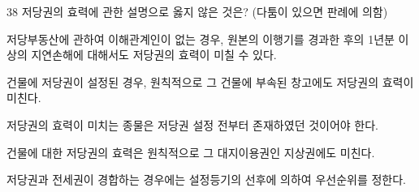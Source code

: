 \begin{question}{38}
저당권의 효력에 관한 설명으로 옳지 않은 것은? (다툼이 있으면 판례에 의함)
\begin{choices}
  \item 저당부동산에 관하여 이해관계인이 없는 경우, 원본의 이행기를 경과한 후의 1년분 이상의 지연손해에 대해서도 저당권의 효력이 미칠 수 있다.
  \item 건물에 저당권이 설정된 경우, 원칙적으로 그 건물에 부속된 창고에도 저당권의 효력이 미친다.
  \item 저당권의 효력이 미치는 종물은 저당권 설정 전부터 존재하였던 것이어야 한다.
  \item 건물에 대한 저당권의 효력은 원칙적으로 그 대지이용권인 지상권에도 미친다.
  \item 저당권과 전세권이 경합하는 경우에는 설정등기의 선후에 의하여 우선순위를 정한다.
\end{choices}
\end{question}
